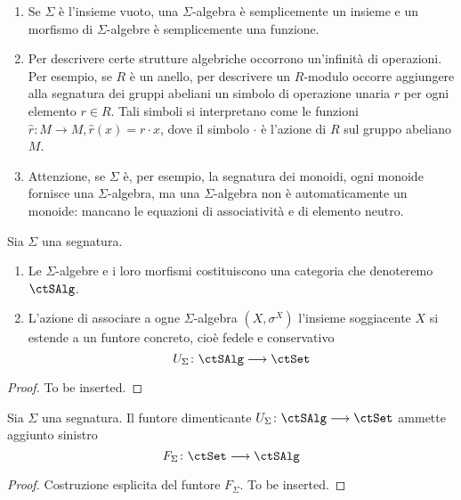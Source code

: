 \begin{examples}\label{esempi_sigma_alg}
	\hfill
	\begin{enumerate}
		\item Se \(\Sigma\) è l'insieme vuoto, una \(\Sigma\)-algebra è semplicemente un insieme e un morfismo di \(\Sigma\)-algebre è
		      semplicemente una funzione.
		\item Per descrivere certe strutture algebriche occorrono un'infinità di operazioni. Per esempio, se \(R\) è un anello, per descrivere un
		      \(R\)-modulo occorre aggiungere alla segnatura dei gruppi abeliani un simbolo di operazione unaria \(\widehat{r}\) per ogni elemento \(r \in R\).
		      Tali simboli si interpretano come le funzioni \(\widehat{r} \colon M \to M, \widehat{r}(x) = r \cdot x\), dove il simbolo \(\cdot\) è l'azione di \(R\)
		      sul gruppo abeliano \(M\).
		\item Attenzione, se \(\Sigma\) è, per esempio, la segnatura dei monoidi, ogni monoide fornisce una \(\Sigma\)-algebra, ma una \(\Sigma\)-algebra
		      non è automaticamente un monoide: mancano le equazioni di associatività e di elemento neutro.
	\end{enumerate}
\end{examples}

\begin{proposition}\label{prop_cat_sigma_alg}
	Sia \(\Sigma\) una segnatura.
	\begin{enumerate}
		\item Le \(\Sigma\)-algebre e i loro morfismi costituiscono una categoria che denoteremo \(\ctSAlg\).
		\item L'azione di associare a ogne \(\Sigma\)-algebra \((X,\sigma^X)\) l'insieme soggiacente \(X\) si estende a un funtore concreto, cioè fedele e
		      conservativo
		      \[
			      U_{\Sigma} \colon \ctSAlg \fun \ctSet
		      \]
	\end{enumerate}
\end{proposition}

\begin{proof}
	To be inserted.
\end{proof}

\begin{proposition}\label{prop_alg_libera}
	Sia \(\Sigma\) una segnatura. Il funtore dimenticante \(U_{\Sigma} \colon \ctSAlg \fun \ctSet\) ammette aggiunto sinistro
	\[
		F_{\Sigma} \colon \ctSet \fun \ctSAlg
	\]
\end{proposition}

\begin{proof}
	Costruzione esplicita del funtore \(F_{\Sigma}\). To be inserted.
\end{proof}

